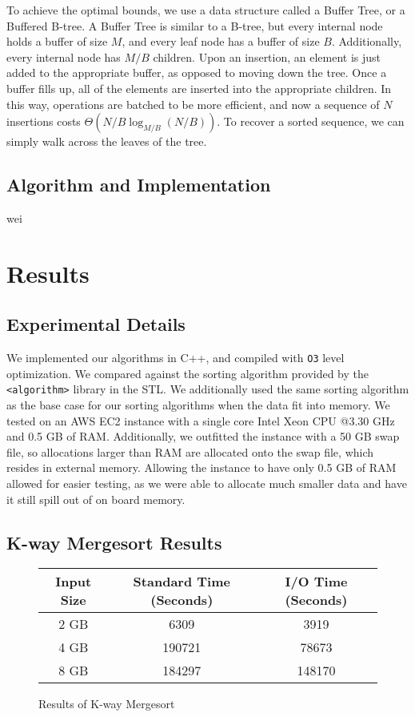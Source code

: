 \documentclass{article}
\begin{document}
To achieve the optimal bounds, we use a data structure called
a Buffer Tree, or a Buffered B-tree.
%
A Buffer Tree is similar to a B-tree, but every internal node
holds a buffer of size $M$, and every leaf node has a buffer
of size $B$.
%
Additionally, every internal node has $M/B$ children.
%
Upon an insertion, an element is just added to the appropriate buffer,
as opposed to moving down the tree.
%
Once a buffer fills up, all of the elements are inserted into the appropriate
children.
%
In this way, operations are batched to be more efficient, and now a sequence
of $N$ insertions costs $\Theta(N/B \log_{M/B}(N/B))$.
%
To recover a sorted sequence, we can simply walk across the leaves of the tree.




\subsection{Algorithm and Implementation}
wei

\section{Results}

\subsection{Experimental Details}
We implemented our algorithms in C++, and compiled with \texttt{O3} level
optimization.
%
We compared against the sorting algorithm provided by the
\texttt{<algorithm>} library in the STL.
%
We additionally used the same sorting algorithm as the base case for our
sorting algorithms when the data fit into memory.
%
We tested on an AWS EC2 instance with a single core Intel Xeon CPU @3.30 GHz and 0.5 GB of RAM.
%
Additionally, we outfitted the instance with a 50 GB swap file, so allocations
larger than RAM are allocated onto the swap file, which resides in external memory.
%
Allowing the instance to have only 0.5 GB of RAM allowed for easier testing,
as we were able to allocate much smaller data and have it still spill out of
on board memory.

\subsection{K-way Mergesort Results}

\begin{figure}
  \centering
  \begin{tabular}{|c|c|c|}
    \hline
    Input Size & Standard Time (Seconds) & I/O Time (Seconds)\\
    \hline
    \hline
    2 GB & 6309 & 3919 \\
    \hline
    4 GB & 190721 & 78673 \\
    \hline
    8 GB & 184297 & 148170 \\
    \hline
  \end{tabular}
  \caption{Results of K-way Mergesort}
  \label{k-merge-res}
\end{figure}
\end{document}
